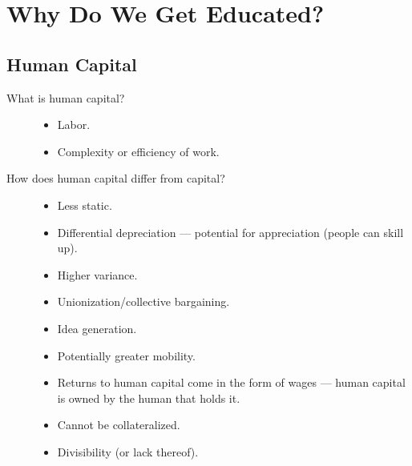 \documentclass[10pt]{extarticle}
\begin{document}
\section{Why Do We Get Educated?}%
\subsection{Human Capital}%
  \begin{description}
    \item[What is human capital?]\hfill
      \begin{itemize}
        \item Labor. 
        \item Complexity or efficiency of work.
      \end{itemize}
    \item[How does human capital differ from capital?]\hfill
      \begin{itemize}
        \item Less static.
        \item Differential depreciation --- potential for appreciation (people can skill up).
        \item Higher variance.
        \item Unionization/collective bargaining.
        \item Idea generation.
        \item Potentially greater mobility.
        \item Returns to human capital come in the form of wages --- human capital is owned by the human that holds it.
        \item Cannot be collateralized.
        \item Divisibility (or lack thereof).
      \end{itemize}
  \end{description}
\end{document}
